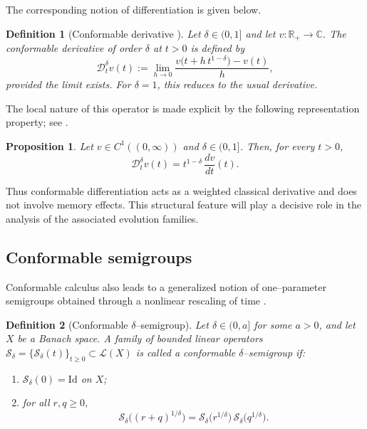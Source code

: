 \documentclass[preprint,12pt]{elsarticle}
\newtheorem{definition}{Definition}
\newtheorem{proposition}{Proposition}
\newcommand{\R}{\mathbb {R}}
\newcommand{\C}{\mathbb {C}}
\begin{document}
The corresponding notion of differentiation is given below.

\begin{definition}[Conformable derivative {\cite{khalil2014,abdeljawad2015}}]
Let $\delta\in(0,1]$ and let $v:\R_+\to\C$.
The conformable derivative of order $\delta$ at $t>0$ is defined by
\[
\mathcal{D}_t^\delta v(t)
:=
\lim_{h\to 0}
\frac{v\bigl(t+h\,t^{1-\delta}\bigr)-v(t)}{h},
\]
provided the limit exists.
For $\delta=1$, this reduces to the usual derivative.
\end{definition}

The local nature of this operator is made explicit by the following
representation property; see \cite{abdeljawad2015,abdeljawad2016}.

\begin{proposition}
Let $v\in C^1((0,\infty))$ and $\delta\in(0,1]$. Then, for every $t>0$,
\[
\mathcal{D}_t^\delta v(t)
=
t^{1-\delta}\,\frac{dv}{dt}(t).
\]
\end{proposition}

Thus conformable differentiation acts as a weighted classical derivative and
does not involve memory effects.
This structural feature will play a decisive role in the analysis of the
associated evolution families.

\subsection{Conformable semigroups}

Conformable calculus also leads to a generalized notion of one--parameter
semigroups obtained through a nonlinear rescaling of time
\cite{abdeljawad2015semigroup}.

\begin{definition}[Conformable $\delta$--semigroup]
Let $\delta\in(0,a]$ for some $a>0$, and let $X$ be a Banach space.
A family of bounded linear operators
\(
\mathcal{S}_\delta=\{\mathcal{S}_\delta(t)\}_{t\ge0}\subset\mathcal{L}(X)
\)
is called a \emph{conformable $\delta$--semigroup} if:
\begin{enumerate}
\item $\mathcal{S}_\delta(0)=\mathrm{Id}$ on $X$;
\item for all $r,q\ge0$,
\[
\mathcal{S}_\delta\bigl((r+q)^{1/\delta}\bigr)
=
\mathcal{S}_\delta\bigl(r^{1/\delta}\bigr)\,
\mathcal{S}_\delta\bigl(q^{1/\delta}\bigr).
\]
\end{enumerate}
\end{definition}
\end{document}
